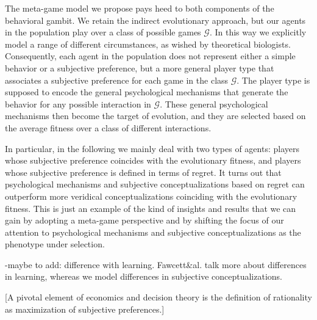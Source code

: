 \documentclass[fleqn,reqno,11pt]{article}
\begin{document}
The meta-game model we propose pays heed to both components of the behavioral gambit. We retain the indirect evolutionary approach, but our agents in the population play over a class of possible games $\mathcal{G}$. In this way we explicitly model a range of different circumstances, as wished by theoretical biologists.  Consequently, each agent in the population does not represent either a simple behavior or a subjective preference, but a more general player type that associates a subjective preference for each game in the class $\mathcal{G}$. The player type is supposed to encode the general psychological mechanisms that generate the behavior for any possible interaction in $\mathcal{G}$. These general psychological mechanisms then become the target of evolution, and they are selected based on the average fitness over a class of different interactions. 

In particular, in the following we mainly deal with two types of agents: players whose subjective preference coincides with the evolutionary fitness, and players whose subjective preference is defined in terms of regret. It turns out that psychological mechanisms and subjective conceptualizations based on regret can outperform more veridical conceptualizations coinciding with the evolutionary fitness.
This is just an example of the kind of insights and results that we can gain by adopting a meta-game perspective and by shifting the focus of our attention to psychological mechanisms and subjective conceptualizations as the phenotype under selection.


-maybe to add: difference with learning. Fawcett\&al. talk more about differences in learning, whereas we model differences in subjective conceptualizations.


[A pivotal element of economics and decision theory is the definition of rationality as
maximization of subjective preferences.]
\end{document}
